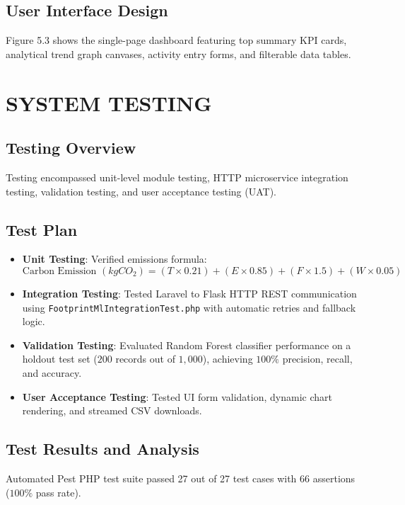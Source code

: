 \documentclass[12pt,a4paper]{report}
\begin{document}
\section{User Interface Design}
Figure 5.3 shows the single-page dashboard featuring top summary KPI cards, analytical trend graph canvases, activity entry forms, and filterable data tables.

\chapter{SYSTEM TESTING}

\section{Testing Overview}
Testing encompassed unit-level module testing, HTTP microservice integration testing, validation testing, and user acceptance testing (UAT).

\section{Test Plan}
\begin{itemize}
    \item \textbf{Unit Testing}: Verified emissions formula:
    $$\text{Carbon Emission } (kg CO_2) = (T \times 0.21) + (E \times 0.85) + (F \times 1.5) + (W \times 0.05)$$
    \item \textbf{Integration Testing}: Tested Laravel to Flask HTTP REST communication using \texttt{FootprintMlIntegrationTest.php} with automatic retries and fallback logic.
    \item \textbf{Validation Testing}: Evaluated Random Forest classifier performance on a holdout test set ($200$ records out of $1,000$), achieving $100\%$ precision, recall, and accuracy.
    \item \textbf{User Acceptance Testing}: Tested UI form validation, dynamic chart rendering, and streamed CSV downloads.
\end{itemize}

\section{Test Results and Analysis}
Automated Pest PHP test suite passed 27 out of 27 test cases with 66 assertions ($100\%$ pass rate).
\end{document}

